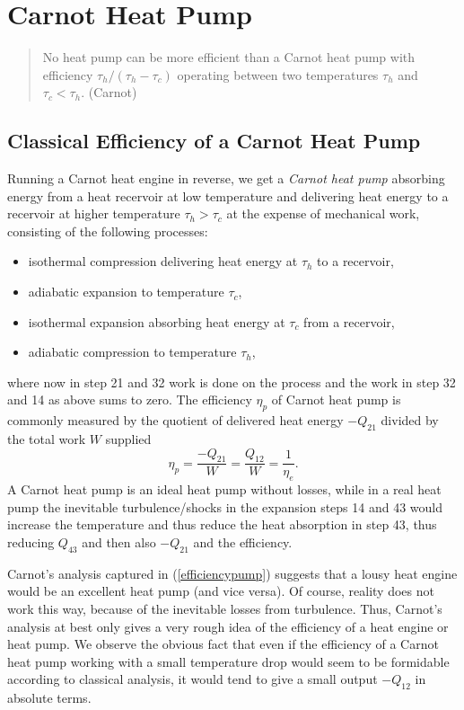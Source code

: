  
\chapter{Carnot Heat Pump}

\small
\begin{quote}
No heat pump can be more efficient than a 
Carnot heat pump with efficiency
$\tau_h/(\tau_h-\tau_c)$ operating between two temperatures 
$\tau_h$ and $\tau_c<\tau_h$.
(Carnot)
\end{quote}
\normalsize



\section{Classical Efficiency of a Carnot Heat Pump}

Running a Carnot heat engine in reverse, we get a \emph{Carnot
heat pump} absorbing energy
from a heat recervoir at low temperature and delivering 
heat energy to a recervoir at higher temperature $\tau_h>\tau_c$ at the expense of mechanical work, consisting of the following 
processes:
\begin{itemize}

\item[(21)] isothermal compression delivering heat energy at $\tau_h$
to a recervoir,
\item[(14)] adiabatic expansion to temperature $\tau_c$,
\item[(43)] isothermal expansion absorbing heat energy  
at $\tau_c$ from a recervoir,
\item[(32)] adiabatic compression to temperature $\tau_h$,
\end{itemize}
where now in step 21 and 32 work is done on the process and the work
in step 32 and 14 as above sums to zero.
The efficiency $\eta_p$ of Carnot heat pump is commonly measured by
the quotient of delivered heat energy $-Q_{21}$ divided by the 
total work $W$ supplied 
\begin{equation}\label{efficiencypump}
\eta_{p} =\frac{-Q_{21}}{W}=\frac{Q_{12}}{W}=\frac{1}{\eta_{e}}.
\end{equation}
A Carnot heat pump is an ideal heat pump without losses, 
while in a real heat pump 
the inevitable turbulence/shocks in the expansion steps 14 and 43 
would increase the temperature and thus reduce the heat absorption 
in step 43, thus reducing $Q_{43}$ and then also $-Q_{21}$ and 
the efficiency. 

Carnot's analysis captured in (\ref{efficiencypump}) suggests that
a lousy heat engine would be an excellent heat pump (and vice versa).
Of course, reality does not work this way, because of the inevitable
losses from turbulence.
Thus, Carnot's analysis at best only gives a very rough idea
of the efficiency of a heat engine or heat pump. 
We observe the obvious fact 
that even if the efficiency of a Carnot heat pump working with a
small temperature drop would seem to be formidable according
to classical analysis, it would 
tend to give a small output $-Q_{12}$ in absolute terms.

